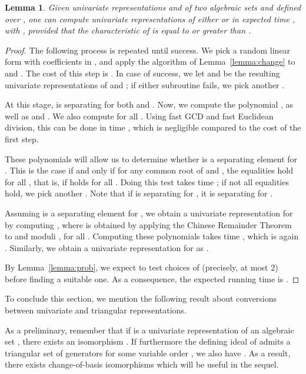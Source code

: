 \documentclass[12pt]{article}
\newtheorem{Lemma}{Lemma}
\begin{document}
\begin{Lemma}\label{lemma:merge}
  Given univariate representations  and
   of two algebraic sets  and  defined over , one can compute univariate
  representations of either  or  in expected time , with , provided that the
  characteristic of  is equal to  or greater than .
\end{Lemma}
\begin{proof}
  The following process is repeated until success. We pick a random
  linear form  with
  coefficients in , and apply the
  algorithm of Lemma~\ref{lemma:change} to  and
  .  The cost of this step is . In
  case of success, we let  and
   be the resulting univariate representations
  of  and ; if either subroutine fails, we pick another
  .

  At this stage,  is separating for both  and .  Now,
  we compute the polynomial , as well as  and
  . We also compute
   for all . Using fast GCD and fast
  Euclidean division, this can be done in time
  , which is negligible
  compared to the cost of the first step.

  These polynomials will allow us to determine whether  is a
  separating element for . This is the case if and only if
  for any common root  of  and , the equalities
   hold for all , that is, if
   holds for all . Doing this test takes time
  ; if not all equalities hold, we pick another .
  Note that if  is separating for , it is
  separating for .

  Assuming  is a separating element for , we obtain
  a univariate representation for  by computing , where  is obtained by applying
  the Chinese Remainder Theorem to  and moduli
  , for all . Computing these polynomials takes time
  , which is again
  . Similarly, we obtain a univariate representation
  for  as .

  By Lemma~\ref{lemma:prob}, we expect to test  choices of
   (precisely, at most 2) before finding a suitable one.  As
  a consequence, the expected running time is .
\end{proof}

To conclude this section, we mention the following result about
conversions between univariate and triangular representations.

As a preliminary, remember that if  is a univariate
representation of an algebraic set , there exists an isomorphism
. If furthermore
the defining ideal of  admits a triangular set of generators 
for some variable order , we also have . As a result, there exists  change-of-basis isomorphisms
 which will be useful in the sequel.
\end{document}
